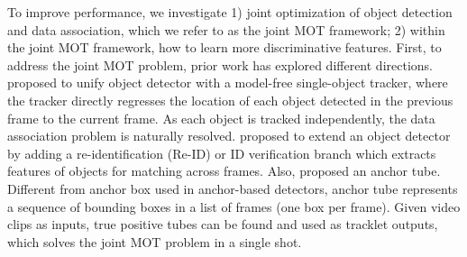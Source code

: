 \documentclass[letterpaper, 10 pt, conference]{ieeeconf}
\begin{document}
To improve performance, we investigate 1) joint optimization of object detection and data association, which we refer to as the joint MOT framework; 2) within the joint MOT framework, how to learn more discriminative features. First, to address the joint MOT problem, prior work \cite{B2016, Feichtenhofer2017, Bergmann2019, zhou2020tracking, Voigtlaender2019, Wang2019, zhang2020fairmot, peng2020chainedtracker, pang2020tubetk, Sun2020} has explored different directions. \cite{B2016, Bergmann2019, Feichtenhofer2017, zhou2020tracking} proposed to unify object detector with a model-free single-object tracker, where the tracker directly regresses the location of each object detected in the previous frame to the current frame. As each object is tracked independently, the data association problem is naturally resolved. \cite{Voigtlaender2019, Wang2019, zhang2020fairmot, peng2020chainedtracker} proposed to extend an object detector by adding a re-identification (Re-ID) \cite{cuhk} or ID verification branch which extracts features of objects for matching across frames. Also, \cite{pang2020tubetk, Sun2020} proposed an anchor tube. Different from anchor box used in anchor-based detectors, anchor tube represents a sequence of bounding boxes in a list of frames (one box per frame). Given video clips as inputs, true positive tubes can be found and used as tracklet outputs, which solves the joint MOT problem in a single shot. 
\end{document}
